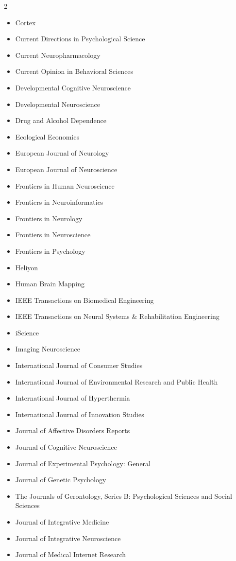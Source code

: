 \documentclass[11pt, letterpaper]{article}
\begin{document}
\begin{multicols}{2}
\begin{itemize}[noitemsep]
\item Cortex
\item Current Directions in Psychological Science
\item Current Neuropharmacology
\item Current Opinion in Behavioral Sciences
\item Developmental Cognitive Neuroscience 
\item Developmental Neuroscience 
\item Drug and Alcohol Dependence
\item Ecological Economics
\item European Journal of Neurology
\item European Journal of Neuroscience
\item Frontiers in Human Neuroscience 
\item Frontiers in Neuroinformatics 
\item Frontiers in Neurology 
\item Frontiers in Neuroscience 
\item Frontiers in Psychology 
\item Heliyon
\item Human Brain Mapping 
\item IEEE Transactions on Biomedical Engineering
\item IEEE Transactions on Neural Systems \& Rehabilitation Engineering
\item iScience
\item Imaging Neuroscience
\item International Journal of Consumer Studies
\item International Journal of Environmental Research and Public Health
\item International Journal of Hyperthermia 
\item International Journal of Innovation Studies
\item Journal of Affective Disorders Reports
\item Journal of Cognitive Neuroscience 
\item Journal of Experimental Psychology: General
\item Journal of Genetic Psychology
\item The Journals of Gerontology, Series B: Psychological Sciences and Social Sciences
\item Journal of Integrative Medicine 
\item Journal of Integrative Neuroscience 
\item Journal of Medical Internet Research

\end{itemize}
\end{multicols}
\end{document}
